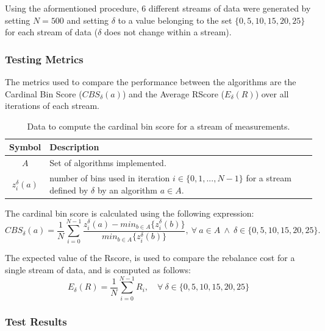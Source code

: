 Using the aformentioned procedure, 6 different streams of data were generated by
setting $N = 500$ and setting $\delta$ to a value belonging to the set
$\{0, 5, 10, 15, 20, 25\}$ for each stream of data ($\delta$ does not change
within a stream).

\subsubsection{Testing Metrics}

The metrics used to compare the performance between the algorithms are the
Cardinal Bin Score ($CBS_\delta(a)$) and the Average RScore ($E_\delta(R)$) over all iterations
of each stream.

\begin{table}[H] 
\centering 
\caption{Data to compute the cardinal bin score for a stream of measurements.} 
\label{table:bin_score} 
    \begin{tabular}{ |c|p{}| } 
    \hline 
    \textbf{Symbol} & \textbf{Description} \\ 
    \hline 
    $A$ & Set of algorithms implemented. \\ 
    $z_i^\delta(a)$ & number of bins used in iteration $i \in \{0, 1, ..., N-1\}$ for a
        stream defined by $\delta$ by an algorithm $a \in A$. \\ 
    \hline 
\end{tabular} 
\end{table}

The cardinal bin score is calculated using the following expression:
\begin{equation}
    CBS_\delta(a) = \frac{1}{N}
        \sum_{i=0}^{N-1} 
            \frac{  z_i^\delta(a) - min_{b \in A} \{z_i^\delta(b)\} }
                 {min_{b \in A} \{z_i^\delta(b)\} }, \ 
        \forall \ a \in A \ \wedge \ \delta \in \{0, 5, 10, 15, 20, 25\}. 
\end{equation}

The expected value of the Rscore, is used to compare the rebalance cost for a
single stream of data, and is computed as follows:
\begin{equation}
    E_\delta(R) = \frac{1}{N} 
        \sum_{i=0}^{N-1} R_i, \quad
        \forall \ \delta \in \{0, 5, 10, 15, 20, 25\}
\end{equation}

\subsubsection{Test Results}
\label{subsub:test_results}

